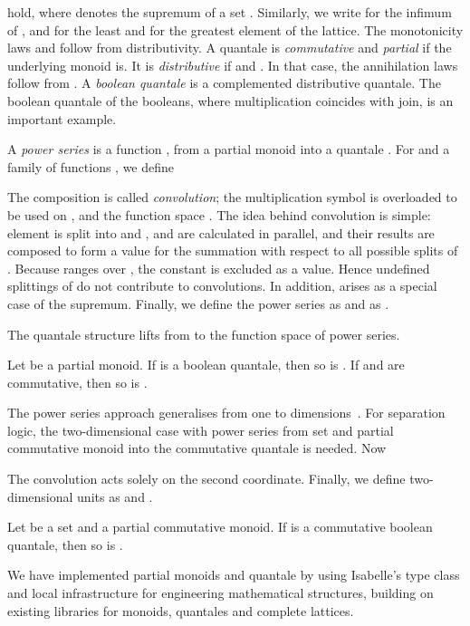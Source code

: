 \documentclass[twoside,runningheads,envcountsame,envcountsect,oribibl,orivec]{llncs}
\begin{document}
hold, where  denotes the supremum of a set . Similarly, we write  for the infimum of , and  for
the least and  for the greatest element of the lattice.  The
monotonicity laws  and
 follow from distributivity.
A quantale is \emph{commutative} and \emph{partial} if the underlying
monoid is. It is \emph{distributive} if  and . In that case, the annihilation laws  follow from .  A \emph{boolean quantale} is a complemented
distributive quantale. The boolean quantale  of the
booleans, where multiplication coincides with join, is an important
example.

A \emph{power series} is a function , from a
partial monoid  into a quantale .  For  and a family of functions
,  we define
 
 The composition  is called \emph{convolution}; the
 multiplication symbol is overloaded to be used on ,  and the
 function space .  The idea behind convolution is simple: element
  is split into  and ,  and  are calculated in
 parallel, and their results are composed to form a value for the
 summation with respect to all possible splits of . Because 
 ranges over , the constant  is excluded as a
 value. Hence undefined splittings of  do not contribute to
 convolutions. In addition,  arises as a
 special case of the supremum.  Finally, we define the power series
  as  and  as
 .

 The quantale structure lifts from  to the function space  of
 power series.
\begin{theorem}\label{thm:quantale-lifting} 
  Let  be a partial monoid. If  is a boolean quantale, then so
  is . If  and  are commutative, then so is .
\end{theorem}

The power series approach generalises from one to 
dimensions~\cite{DHS14}. For separation logic, the
two-dimensional case with power series  from 
set  and partial commutative monoid  into the commutative
quantale  is needed.  Now

The convolution  acts solely on the second
coordinate. Finally, we define two-dimensional units as  and .
\begin{theorem}\label{thm:sh-lifting}
  Let  be a set and  a partial commutative monoid. If  is a
  commutative boolean quantale, then so is .
\end{theorem}
We have implemented partial monoids and quantale by using Isabelle's
type class and local infrastructure for engineering mathematical
structures, building on existing libraries for monoids, quantales and
complete lattices.
\end{document}

